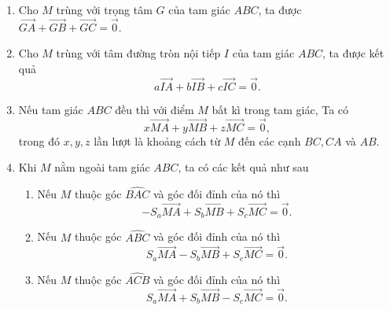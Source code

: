 \begin{note}
	\begin{enumerate}
		\item Cho $M$ trùng với trọng tâm $G$ của tam giác $ABC$, ta được $ \overrightarrow {GA}  +  \overrightarrow{GB}  +  \overrightarrow{GC}= \overrightarrow {0}$.
		\item Cho $M$ trùng với tâm đường tròn nội tiếp $I$ của tam giác $ABC$, ta được kết quả\\ \[a\overrightarrow {IA}  +  b\overrightarrow {IB}  +  c\overrightarrow {IC}= \overrightarrow {0}.\]
		\item Nếu tam giác $ABC$ đều thì với điểm $M$ bất kì trong tam giác, Ta có 
		\[x\overrightarrow {MA}  +  y\overrightarrow {MB}  +  z\overrightarrow {MC}= \overrightarrow {0},\]
		trong đó $x,y,z$ lần lượt là khoảng cách từ $M$ đến các cạnh $BC,CA$ và $AB$.
		\item Khi $M$ nằm ngoài tam giác $ABC$, ta có các kết quả như sau
		\begin{enumerate}
			\item Nếu $M$ thuộc góc $\widehat{BAC}$ và góc đối đỉnh của nó thì  $$  -  S_a\overrightarrow {MA}  +  S_b\overrightarrow {MB}  +  S_c\overrightarrow {MC}= \overrightarrow {0}.$$
			\item Nếu $M$ thuộc góc $\widehat{ABC}$ và góc đối đỉnh của nó thì  $$S_a\overrightarrow {MA}  -  S_b\overrightarrow {MB}  +  S_c\overrightarrow {MC}= \overrightarrow {0}.$$
			\item Nếu $M$ thuộc góc $\widehat{ACB}$ và góc đối đỉnh của nó thì  $$S_a\overrightarrow {MA}  +  S_b\overrightarrow {MB}  -S_c\overrightarrow {MC}= \overrightarrow {0}.$$
		\end{enumerate}
	\end{enumerate}
\end{note}
